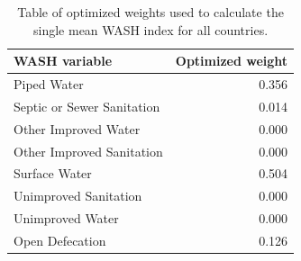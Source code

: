 \documentclass[
]{book}
\begin{document}
\begin{table}
\centering
\caption{\label{tab:wash-weights}Table of optimized weights used to calculate the single mean WASH index for all countries.}
\centering
\begin{tabular}[t]{l|r}
\hline
WASH variable & Optimized weight\\
\hline
Piped Water & 0.356\\
\hline
Septic or Sewer Sanitation & 0.014\\
\hline
Other Improved Water & 0.000\\
\hline
Other Improved Sanitation & 0.000\\
\hline
Surface Water & 0.504\\
\hline
Unimproved Sanitation & 0.000\\
\hline
Unimproved Water & 0.000\\
\hline
Open Defecation & 0.126\\
\hline
\end{tabular}
\end{table}
\end{document}

